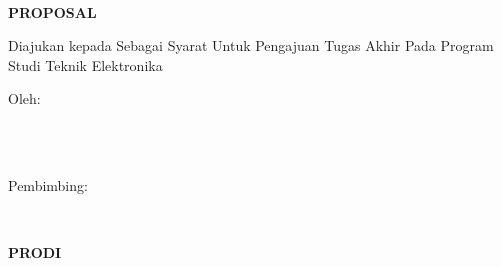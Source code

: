 
\newpage
\thispagestyle{empty}
\begin{center}
    \begin{doublespace}
        \textbf{\large{\MakeUppercase{\judulid}}}\\[2.5cm]
    \end{doublespace}

    \textbf{\MakeUppercase{\large{Proposal \tipe}}}\\[0.5cm]
    \begin{onehalfspace}
        Diajukan kepada {\fakultas} {\universitas} Sebagai Syarat Untuk Pengajuan Tugas Akhir Pada Program Studi Teknik Elektronika\\[1.8cm]
    \end{onehalfspace}

    \large Oleh: \\
    \begin{onehalfspace}
        \large{\penulis} \\
        \large{\nim}\\[1.5cm]
    \end{onehalfspace}
    \vspace{1.5cm}

    \large Pembimbing: \\
    \begin{onehalfspace}
        \large{\pembimbing} \\
    \end{onehalfspace}

    \vfill

    \textbf{\large \MakeUppercase{Prodi \prodi}}\\
    \textbf{\large \MakeUppercase{\fakultas}}\\
    \textbf{\large \MakeUppercase{\universitas}}\\
    \textbf{\large \the\year{}}\\
\end{center}

